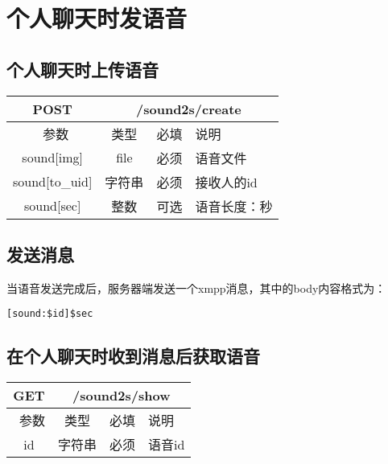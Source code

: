 
\section{个人聊天时发语音}

\subsection{个人聊天时上传语音}

\begin{table}[H]
   \begin{center}
\begin{tabular}{|c|c|c|p{12cm}|}
\hline
POST & \multicolumn{3}{|c|}{/sound2s/create} \\
\hline\hline
 \  参数  & 类型 & 必填 &  说明  \\
\hline
 sound[img]  & file & 必须 &  语音文件\\
 \hline
 sound[to\_uid]  & 字符串 & 必须 &  接收人的id\\
\hline
  sound[sec]  & 整数 & 可选 &  语音长度：秒\\
 \hline
\end{tabular}
   \end{center}
\end{table}


\subsection{发送消息}
当语音发送完成后，服务器端发送一个xmpp消息，其中的body内容格式为：

\begin{verbatim}
[sound:$id]$sec

\end{verbatim}

\subsection{在个人聊天时收到消息后获取语音}
\begin{table}[H]
   \begin{center}
\begin{tabular}{|c|c|c|p{12cm}|}
\hline
GET & \multicolumn{3}{|c|}{/sound2s/show} \\
\hline\hline
 \  参数  & 类型 & 必填 &  说明  \\
  \hline
 id  & 字符串 & 必须 & 语音id\\
\hline
\end{tabular}
   \end{center}
\end{table}


